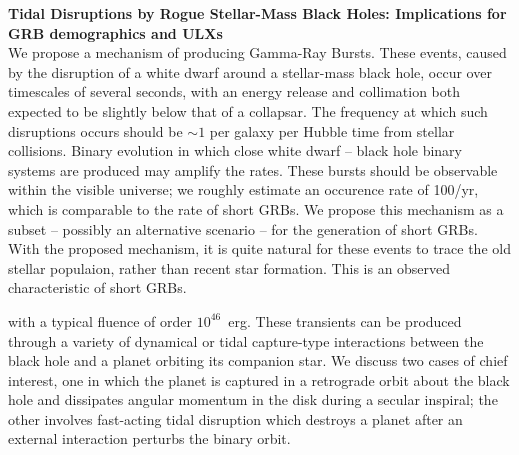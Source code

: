 {\bf Tidal Disruptions by Rogue Stellar-Mass Black Holes:  Implications for GRB demographics and ULXs}\\



  We propose a mechanism of producing Gamma-Ray Bursts.  These events, caused by the disruption of a white dwarf around a stellar-mass black hole, occur over timescales of several seconds, with an energy release and collimation both expected to be slightly below that of a collapsar.  The frequency at which such disruptions occurs should be $\sim1$ per galaxy per Hubble time from stellar collisions.  Binary evolution in which close white dwarf -- black hole binary systems are produced may amplify the rates.  These bursts should be observable within the visible universe; we roughly estimate an occurence rate of 100/yr, which is comparable to the rate of short GRBs.  We propose this mechanism as a subset -- possibly an alternative scenario -- for the generation of short GRBs.  With the proposed mechanism, it is quite natural for these events to trace the old stellar populaion, rather than recent star formation.  This is an observed characteristic of short GRBs. 
  
    with a typical
  fluence of order $10^{46}$~erg.  These transients can be produced
  through a variety of dynamical or tidal capture-type interactions
  between the black hole and a planet orbiting its companion star.  We
  discuss two cases of chief interest, one in which the planet is
  captured in a retrograde orbit about the black hole and dissipates
  angular momentum in the disk during a secular inspiral; the other
  involves fast-acting tidal disruption which destroys a planet after
  an external interaction perturbs the binary orbit.
  
  
